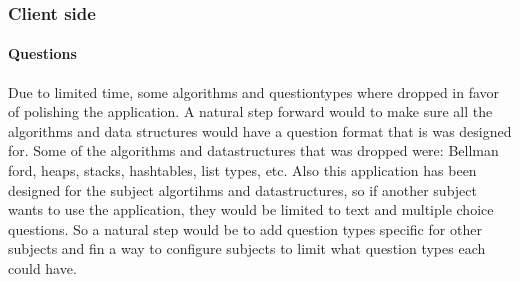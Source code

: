 \subsubsection{Client side}
\paragraph{Questions}
Due to limited time, some algorithms and questiontypes where dropped in favor of polishing the application. A natural step forward would to make sure all the algorithms and data structures would have a question format that is was designed for. Some of the algorithms and datastructures that was dropped were: Bellman ford, heaps, stacks, hashtables, list types, etc. Also this application has been designed for the subject algortihms and datastructures, so if another subject wants to use the application, they would be limited to text and multiple choice questions. So a natural step would be to add question types specific for other subjects and fin a way to configure subjects to limit what question types each could have.